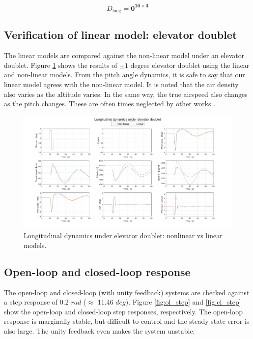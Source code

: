 \documentclass[lettersize,journal]{IEEEtran}
\begin{document}
\normalsize
\begin{equation}
D_{\mathrm{long}}=\bm{0^{10\times3}}
\end{equation}

\subsection{Verification of linear model: elevator doublet}
The linear models are compared against the non-linear model under an elevator doublet. Figure \ref{fig:elevator_doublet} shows the results of $\pm 1$ degree elevator doublet using the linear and non-linear models. From the pitch angle dynamics, it is safe to say that our linear model agrees with the non-linear model. It is noted that the air density also varies as the altitude varies. In the same way, the true airspeed also changes as the pitch changes. These are often times neglected by other works \cite{ref4, ref5, ref6, ref8}.

\begin{figure}[!t]
\centering
\includegraphics[width=7in]{figs/elevator_doublet.pdf}%
\caption{Longitudinal dynamics under elevator doublet: nonlinear vs linear models.}
\label{fig:elevator_doublet}
\end{figure}

\subsection{Open-loop and closed-loop response}
The open-loop and closed-loop (with unity feedback) systems are checked against a step response of 0.2 $rad$ ($\approx$ 11.46 $deg$). Figure \ref{fig:ol_step} and \ref{fig:cl_step} show the open-loop and closed-loop step responses, respectively. The open-loop response is marginally stable, but difficult to control and the steady-state error is also large. The unity feedback even makes the system unstable.
\end{document}
